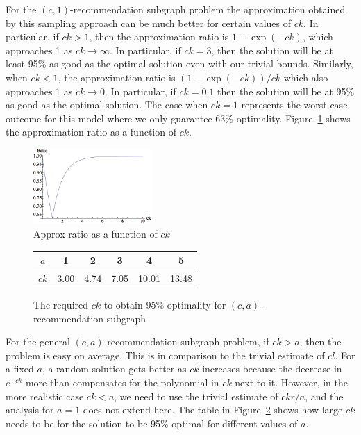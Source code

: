 For the $(c, 1)$-recommendation subgraph problem the approximation obtained by this sampling
approach can be much better for certain values of $ck$. In particular,
if $ck>1$, then the approximation ratio is $1-\exp(-ck)$, which
approaches 1 as $ck\to\infty$. In particular, if $ck=3$, then the
solution will be at least 95\% as good as the optimal solution even
with our trivial bounds. Similarly, when $ck<1$, the approximation
ratio is $(1-\exp(-ck))/ck$ which also approaches 1 as $ck\to 0$. In
particular, if $ck=0.1$ then the solution will be at 95\% as good as
the optimal solution. The case when $ck=1$ represents the
worst case outcome for this model where we only guarantee 63\%
optimality. Figure~\ref{fig:simple_approx} shows the approximation ratio as a
function of $ck$.\vs

\begin{figure}[H]
  \centering
  \includegraphics[width=0.4\textwidth]{images/sri_Original.png}
  \caption{Approx ratio as a function of $ck$ }\label{fig:simple_approx}
\end{figure}

\begin{figure}[H]
  \centering
  \begin{tabular}{ |c|c|c|c|c|c| }
    \hline
    $a$ & 1 & 2 & 3 & 4 & 5 \\ \hline
    $ck$ & 3.00 & 4.74 & 7.05 & 10.01 & 13.48 \\
    \hline
  \end{tabular}
  \caption{The required $ck$ to obtain 95\% optimality for $(c, a)$-recommendation subgraph}
  \label{a-values}
\end{figure}


For the general $(c, a)$-recommendation subgraph problem, if $ck>a$,
then the problem is easy on average. This is in comparison to the
trivial estimate of $cl$. For a fixed $a$, a random solution gets
better as $ck$ increases because the decrease in $e^{-ck}$ more than
compensates for the polynomial in $ck$ next to it. However, in the
more realistic case $ck<a$, we need to use the trivial estimate of
$ckr/a$, and the analysis for $a=1$ does not extend here. The table
in Figure~\ref{a-values} shows how large $ck$ needs to be for the
solution to be 95\% optimal for different values of $a$.\vs

